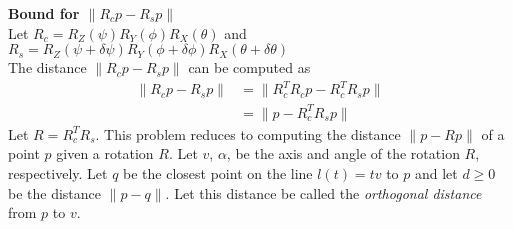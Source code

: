 \documentclass[12pt]{article}
\begin{document}
\textbf{Bound for $\|R_c p - R_s p\|$}\\


Let $R_c = R_Z(\psi) R_Y(\phi)R_X(\theta)$ and $R_s = R_Z(\psi + \delta \psi) R_Y(\phi + \delta \phi)R_X(\theta + \delta \theta)$\\

The distance $\|R_c p - R_s p\|$ can be computed as 
\begin{align*}
\|R_c p - R_s p\| &= \|R_c^T R_c p - R_c^T R_s p\| \\
                          &=  \|p - R_c^T R_s p\| 
\end{align*}         
Let $R =    R_c^T R_s$.  This problem reduces to computing the distance $\|p - R p\|$ of a point $p$ given a rotation $R$. 
Let $v$, $\alpha$, be the axis and angle of the rotation $R$, respectively. Let $q$ be the closest point on the line $l(t) = tv$ to $p$ and let $d \geq 0$
be the distance $\|p - q\|$.  Let this distance be called the \textit{orthogonal distance} from $p$ to $v$.\\
\end{document}
